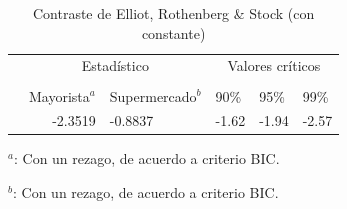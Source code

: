\documentclass[12pt, twoside]{book}\usepackage[]{graphicx}\usepackage[]{color}
\numberwithin{equation}{section}
\numberwithin{theorem}{section}
\numberwithin{teorema}{section}
\numberwithin{defi}{section}
\numberwithin{prop}{section}
\numberwithin{defi}{section}
\theoremstyle{plain}
\begin{document}
\begin{table}[H]
\centering
\begin{threeparttable}
\caption{Contraste de Elliot, Rothenberg \& Stock (con constante)}
\begin{tabular}{@{}lrllll@{}}
\toprule
\multicolumn{1}{l}{} & \multicolumn{2}{c}{Estadístico} &
\multicolumn{3}{c}{Valores críticos} \\
\cmidrule(l){2-3} \cmidrule(l){4-6} \\
\multicolumn{1}{l}{} & \multicolumn{1}{c}{Mayorista$^{a}$} &
 \multicolumn{1}{c}{Supermercado$^{b}$} &
\multicolumn{1}{l}{90\%}&
\multicolumn{1}{l}{95\%}&
\multicolumn{1}{l}{99\%}
\\
\midrule
  & -2.3519 &  -0.8837 & -1.62 & -1.94 & -2.57 \\
\bottomrule
\end{tabular}
\label{tab-9}
\begin{tablenotes}
\small 
\item $^{a}$: Con un rezago, de acuerdo a criterio BIC. 
\item $^{b}$: Con un rezago, de acuerdo a criterio BIC. 
\end{tablenotes}
\end{threeparttable}
\end{table}
\end{document}

